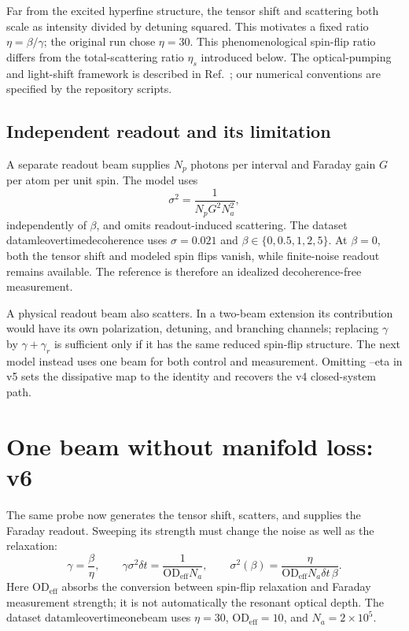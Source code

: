 \documentclass[11pt]{article}
\newcommand{\dt}{\delta t}
\newcommand{\OD}{\mathrm{OD}}
\newcommand{\code}[1]{{\small\ttfamily\def\_{\textunderscore\allowbreak}#1}}
\begin{document}
Far from the excited hyperfine structure, the tensor shift and scattering both
scale as intensity divided by detuning squared. This motivates a fixed ratio
$\eta=\beta/\gamma$; the original run chose $\eta=30$. This phenomenological
spin-flip ratio differs from the total-scattering ratio $\eta_s$ introduced below.
The optical-pumping and light-shift framework is described in Ref.~\cite{deutsch};
our numerical conventions are specified by the repository scripts.

\subsection{Independent readout and its limitation}

A separate readout beam supplies $N_p$ photons per interval and Faraday gain $G$
per atom per unit spin. The model uses
\begin{equation}
 \sigma^2=\frac{1}{N_pG^2N_a^2},
 \label{eq:separate-noise}
\end{equation}
independently of $\beta$, and omits readout-induced scattering. The dataset
\code{data\_mle\_over\_time\_decoherence\_1} uses $\sigma=0.021$ and
$\beta\in\{0,0.5,1,2,5\}$. At $\beta=0$, both the tensor shift and modeled
spin flips vanish, while finite-noise readout remains available. The reference
is therefore an idealized decoherence-free measurement.

A physical readout beam also scatters. In a two-beam extension its contribution
would have its own polarization, detuning, and branching channels; replacing
$\gamma$ by $\gamma+\gamma_r$ is sufficient only if it has the same reduced
spin-flip structure. The next model instead uses one beam for both control and
measurement. Omitting \code{--eta} in v5 sets the dissipative map to the identity
and recovers the v4 closed-system path.

\section{One beam without manifold loss: v6}
\label{sec:onebeam}

The same probe now generates the tensor shift, scatters, and supplies the Faraday
readout. Sweeping its strength must change the noise as well as the relaxation:
\begin{equation}
 \gamma=\frac{\beta}{\eta},\qquad
 \gamma\sigma^2\dt=\frac{1}{\OD_{\mathrm{eff}}N_a},\qquad
 \sigma^2(\beta)=\frac{\eta}{\OD_{\mathrm{eff}}N_a\dt\,\beta}.
 \label{eq:v6}
\end{equation}
Here $\OD_{\mathrm{eff}}$ absorbs the conversion between spin-flip relaxation
and Faraday measurement strength; it is not automatically the resonant optical
depth. The dataset \code{data\_mle\_over\_time\_onebeam\_1} uses
$\eta=30$, $\OD_{\mathrm{eff}}=10$, and $N_a=2\times10^5$.
\end{document}
